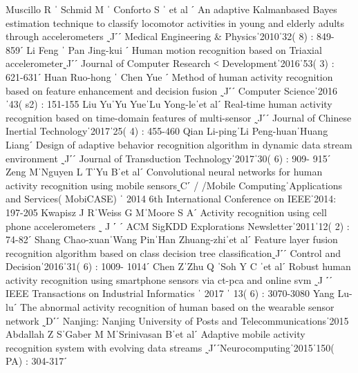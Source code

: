 \documentclass{article}
\begin{document}
\begin{thebibliography}{22}
\bibitem{}
	Muscillo R ˈ Schmid M ˈ Conforto S ˈ et al ˊ An adaptive Kalmanbased Bayes estimation technique to classify locomotor activities in young and elderly adults through accelerometers
˷J˹ˊ  Medical  Engineering  &  Physicsˈ2010ˈ32(  8)  :  849- 859ˊ
\bibitem{}
	Li Feng ˈ Pan Jing-kui ˊ Human motion recognition based on Triaxial  accelerometer˷J˹ˊ  Journal  of  Computer  Research  ˂ Developmentˈ2016ˈ53( 3) : 621-631ˊ
	\bibitem{}
	Huan Ruo-hong ˈ Chen Yue ˊ Method of human activity recognition based on feature enhancement and decision fusion
˷J˹ˊ Computer Scienceˈ2016ˈ43( s2) : 151-155
\bibitem{}
	Liu  YuˈYu  YueˈLu  Yong-leˈet  alˊ  Real-time  human  activity recognition based on time-domain features of multi-sensor
˷J˹ˊ  Journal  of  Chinese  Inertial  Technologyˈ2017ˈ25(  4)  : 455-460
\bibitem{}
	Qian  Li-pingˈLi  Peng-huanˈHuang  Liangˊ  Design  of  adaptive behavior recognition algorithm in dynamic data stream environment
˷J˹ˊ Journal of Transduction Technologyˈ2017ˈ30( 6) : 909- 915ˊ
\bibitem{}
	Zeng  MˈNguyen  L  TˈYu  Bˈet  alˊ   Convolutional  neural networks for human activity recognition using mobile sensors˷C˹
/  /Mobile  ComputingˈApplications  and  Services(  MobiCASE)  ˈ
2014 6th International Conference on IEEEˈ2014: 197-205
\bibitem{}
	Kwapisz  J  RˈWeiss  G  MˈMoore  S  Aˊ  Activity  recognition using cell phone accelerometers ˷ J ˹ ˊ ACM SigKDD Explorations Newsletterˈ2011ˈ12( 2) : 74-82ˊ
	\bibitem{}
Shang  Chao-xuanˈWang  PinˈHan  Zhuang-zhiˈet  alˊ  Feature layer fusion recognition algorithm based on class decision tree classification˷J˹ˊ Control and Decisionˈ2016ˈ31( 6) : 1009- 1014ˊ
\bibitem{}
	Chen  ZˈZhu  Q ˈSoh  Y  C ˈet  alˊ   Robust  human  activity recognition using smartphone sensors via ct-pca and online svm
˷J ˹ˊ   IEEE  Transactions  on  Industrial  Informatics ˈ 2017 ˈ 13( 6) : 3070-3080
\bibitem{}
	Yang Lu-luˊ The abnormal activity recognition of human based on the wearable sensor network ˷D˹ˊ Nanjing: Nanjing University of Posts and Telecommunicationsˈ2015
\bibitem{}
Abdallah  Z  SˈGaber  M  MˈSrinivasan  Bˈet  alˊ   Adaptive mobile activity recognition system with evolving data streams
˷J˹ˊNeurocomputingˈ2015ˈ150( PA) : 304-317ˊ

\end{thebibliography}
\end{document}
